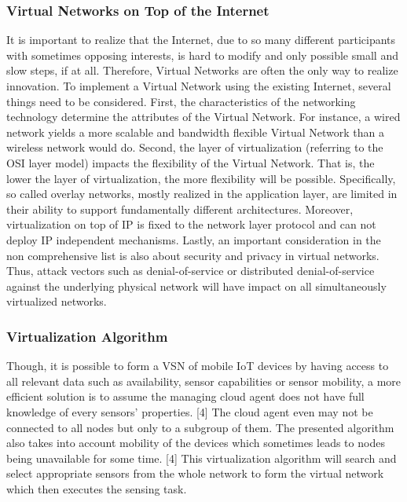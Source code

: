 \documentclass[journal]{IEEEtran}
\begin{document}
\subsubsection{Virtual Networks on Top of the Internet}
It is important to realize that the Internet, due to so many different participants with sometimes opposing interests, is hard to modify and only possible small and slow steps, if at all. Therefore, Virtual Networks are often the only way to realize innovation. To implement a Virtual Network using the existing Internet, several things need to be considered. First, the characteristics of the networking technology determine the attributes of the Virtual Network. For instance, a wired network yields a more scalable and bandwidth flexible Virtual Network than a wireless network would do. \cite{Chowdhury} Second, the layer of virtualization (referring to the OSI layer model) impacts the flexibility of the Virtual Network. That is, the lower the layer of virtualization, the more flexibility will be possible. Specifically, so called overlay networks, mostly realized in the application layer, are limited in their ability to support fundamentally different architectures. \cite{Chowdhury} Moreover, virtualization on top of IP is fixed to the network layer protocol and can not deploy IP independent mechanisms.  \cite{Chowdhury} Lastly, an important consideration in the non comprehensive list is also about security and privacy in virtual networks. Thus, attack vectors such as denial-of-service or distributed denial-of-service against the underlying physical network will have impact on all simultaneously virtualized networks.
\subsubsection{Virtualization Algorithm}
Though, it is possible to form a VSN of mobile IoT devices by having access to all relevant data such as availability, sensor capabilities or sensor mobility, a more efficient solution is to assume the managing cloud agent does not have full knowledge of every sensors’ properties. [4] The cloud agent even may not be connected to all nodes but only to a subgroup of them. The presented algorithm also takes into account mobility of the devices which sometimes leads to nodes being unavailable for some time. [4]
This virtualization algorithm will search and select appropriate sensors from the whole network to form the virtual network which then executes the sensing task.
\end{document}
